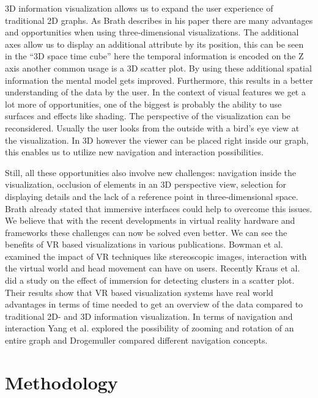 3D information visualization allows us to expand the user experience of traditional 2D graphs. As Brath describes in his paper \cite{brath_3d_2014} there are many advantages and opportunities when using three-dimensional visualizations.
The additional axes allow us to display an additional attribute by its position, this can be seen in the “3D space time cube” \cite{brath_3d_2014} here the temporal information is encoded on the Z axis another common usage is a 3D scatter plot. By using these additional spatial information the mental model gets improved. Furthermore, this results in a better understanding of the data by the user.
In the context of visual features we get a lot more of opportunities, one of the biggest is probably the ability to use surfaces and effects like shading. 
The perspective of the visualization can be reconsidered. Usually the user looks from the outside with a
bird's eye view at the visualization. In 3D however the viewer can be placed right inside our graph, this enables us to utilize new navigation and interaction possibilities. 

Still, all these opportunities also involve new challenges: navigation inside the visualization, occlusion of elements in an 3D perspective view, selection for displaying details and the lack of a reference point in three-dimensional space. Brath \cite{brath_3d_2014} already stated that immersive interfaces could help to overcome this issues.
 We believe that with the recent developments in virtual reality hardware and frameworks these challenges can now be solved even better. 
 We can see the benefits of VR based visualizations in various publications. Bowman et al. \cite{bowman_virtual_2007} examined the impact of VR techniques like stereoscopic images, interaction with the virtual world and head movement can have on users. 
 Recently Kraus et al. \cite{kraus_impact_2020} did a study on the effect of immersion for detecting clusters in a scatter plot. Their results show that VR based visualization systems have real world advantages in terms of time needed to get an overview of the data compared to traditional 2D- and 3D information visualization. In terms of navigation and interaction Yang et al. \cite{yang_embodied_2020} explored the possibility of zooming and rotation of an entire graph and Drogemuller \cite{drogemuller_examining_2020} compared different navigation concepts.
 
 \section{Methodology}

